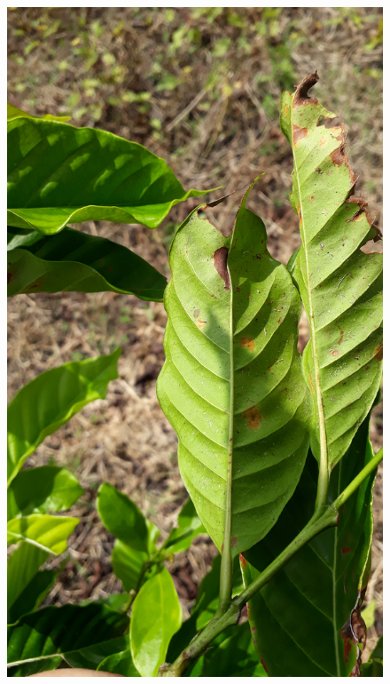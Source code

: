 \documentclass[aspectratio=169]{beamer}
\begin{document}
\begin{frame}
\begin{columns}
        \begin{figure}
            \centering
            \includegraphics[scale = 0.05]{img/C4P20E2.jpg}
            \label{fig:entelabel}
        \end{figure}


    \end{columns}

\end{frame}
\end{document}
